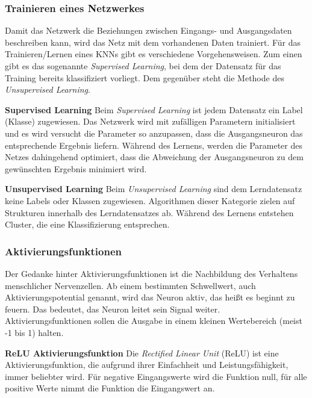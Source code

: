 \documentclass[11pt]{article}
\begin{document}
\subsubsection{Trainieren eines Netzwerkes}

Damit das Netzwerk die Beziehungen zwischen Eingangs- und Ausgangsdaten beschreiben kann, wird das Netz mit dem vorhandenen Daten trainiert. Für das Trainieren/Lernen eines KNNs gibt es verschiedene Vorgehensweisen. Zum einen gibt es das sogenannte \textit{Supervised Learning}, bei dem der Datensatz für das Training bereits klassifiziert vorliegt. Dem gegenüber steht die Methode des \textit{Unsupervised Learning}.

\textbf{Supervised Learning}\newline
Beim \textit{Supervised Learning} ist jedem Datensatz ein Label (Klasse) zugewiesen. Das Netzwerk wird mit zufälligen Parametern initialisiert und es wird versucht die Parameter so anzupassen, dass die Ausgangsneuron das entsprechende Ergebnis liefern. Während des Lernens, werden die Parameter des Netzes dahingehend optimiert, dass die Abweichung der Ausgangsneuron zu dem gewünschten Ergebnis minimiert wird.\parencite{Pattanayak2017}

\textbf{Unsupervised Learning}\newline
Beim \textit{Unsupervised Learning} sind dem Lerndatensatz keine Labels oder Klassen zugewiesen. Algorithmen dieser Kategorie zielen auf Strukturen innerhalb des Lerndatensatzes ab. Während des Lernens entstehen Cluster, die eine Klassifizierung entsprechen.\parencite{Pattanayak2017}

\subsubsection{Aktivierungsfunktionen}
Der Gedanke hinter Aktivierungsfunktionen ist die Nachbildung des Verhaltens menschlicher Nervenzellen. Ab einem bestimmten Schwellwert, auch Aktivierungspotential  genannt, wird das Neuron aktiv, das heißt es beginnt zu feuern. Das bedeutet, das Neuron leitet sein Signal weiter. Aktivierungsfunktionen sollen die Ausgabe in einem kleinen Wertebereich (meist -1 bis 1) halten.\parencite{Manaswi2018}

\textbf{ReLU Aktivierungsfunktion}\newline
Die \textit{Rectified Linear Unit} (ReLU) ist eine Aktivierungsfunktion, die aufgrund ihrer Einfachheit und Leistungsfähigkeit, immer beliebter wird. Für negative Eingangswerte wird die Funktion null, für alle positive Werte nimmt die Funktion die Eingangswert an.\parencite{M.AnderssonM.Arvola}
\end{document}

